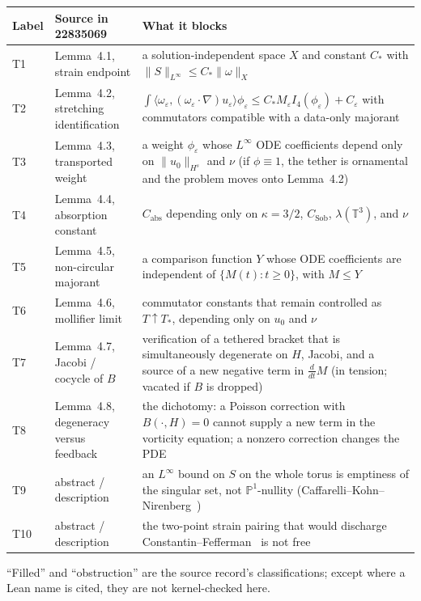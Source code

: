\documentclass[11pt,a4paper]{article}
\theoremstyle{definition}
\theoremstyle{remark}
\newcommand{\T}{\mathbb{T}}
\newcommand{\Hs}{H^{s}}
\begin{document}
{\small
\noindent
\begin{tabularx}{\linewidth}{@{}>{\raggedright\arraybackslash}p{0.7in}>{\raggedright\arraybackslash}p{1.6in}X@{}}
\toprule
Label & Source in 22835069 & What it blocks \\
\midrule
T1 & Lemma~4.1, strain endpoint & a solution-independent space $X$ and constant $C_{\ast}$ with $\|S\|_{L^\infty}\le C_{\ast}\|\omega\|_{X}$ \\
T2 & Lemma~4.2, stretching identification & $\int\langle\omega_{\varepsilon},(\omega_{\varepsilon}\cdot\nabla)u_{\varepsilon}\rangle\phi_{\varepsilon}\le C_{\ast}M_{\varepsilon}I_{4}(\phi_{\varepsilon})+C_{\varepsilon}$ with commutators compatible with a data-only majorant \\
T3 & Lemma~4.3, transported weight & a weight $\phi_{\varepsilon}$ whose $L^\infty$ ODE coefficients depend only on $\|u_0\|_{\Hs}$ and $\nu$ (if $\phi\equiv 1$, the tether is ornamental and the problem moves onto Lemma~4.2) \\
T4 & Lemma~4.4, absorption constant & $C_{\mathrm{abs}}$ depending only on $\kappa=3/2$, $C_{\mathrm{Sob}}$, $\lambda(\T^3)$, and $\nu$ \\
T5 & Lemma~4.5, non-circular majorant & a comparison function $Y$ whose ODE coefficients are independent of $\{M(t):t\ge 0\}$, with $M\le Y$ \\
T6 & Lemma~4.6, mollifier limit & commutator constants that remain controlled as $T\uparrow T_{\ast}$, depending only on $u_0$ and $\nu$ \\
T7 & Lemma~4.7, Jacobi / cocycle of $B$ & verification of a tethered bracket that is simultaneously degenerate on $H$, Jacobi, and a source of a new negative term in $\frac{d}{dt}M$ (in tension; vacated if $B$ is dropped) \\
T8 & Lemma~4.8, degeneracy versus feedback & the dichotomy: a Poisson correction with $B(\cdot,H)=0$ cannot supply a new term in the vorticity equation; a nonzero correction changes the PDE \\
T9 & abstract / description & an $L^\infty$ bound on $S$ on the whole torus is emptiness of the singular set, not $\mathbb{P}^{1}$-nullity (Caffarelli--Kohn--Nirenberg~\cite{CKN}) \\
T10 & abstract / description & the two-point strain pairing that would discharge Constantin--Fefferman~\cite{CF} is not free \\
\bottomrule
\end{tabularx}
}

``Filled'' and ``obstruction'' are the source record's classifications; except where a Lean name is cited, they are not kernel-checked here.
\end{document}

